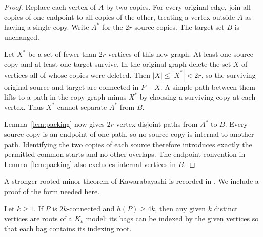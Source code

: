 \begin{proof}
Replace each vertex of $A$ by two copies.  For every original edge, join
all copies of one endpoint to all copies of the other, treating a vertex
outside $A$ as having a single copy.  Write $A^*$ for the $2r$ source
copies.  The target set $B$ is unchanged.

Let $X^*$ be a set of fewer than $2r$ vertices of this new graph.
At least one source copy and at least one target survive.  In the
original graph delete the set $X$ of vertices all of whose copies were
deleted.  Then $|X|\le |X^*|<2r$, so the surviving original source and
target are connected in $P-X$.  A simple path between them lifts to a
path in the copy graph minus $X^*$ by choosing a surviving copy at each
vertex.  Thus $X^*$ cannot separate $A^*$ from $B$.

Lemma~\ref{lem:packing} now gives $2r$ vertex-disjoint paths from $A^*$
to $B$.  Every source copy is an endpoint of one path, so no source copy
is internal to another path.  Identifying the two copies of each source
therefore introduces exactly the permitted common starts and no other
overlaps.  The endpoint convention in Lemma~\ref{lem:packing} also
excludes internal vertices in $B$.
\end{proof}

A stronger rooted-minor theorem of Kawarabayashi is recorded in
\cite[Lemma~5.14]{DelcourtPostle2021}. We include a proof of the form
needed here.

\begin{lemma}\label{lem:rooting}
Let $k\ge1$.  If $P$ is $2k$-connected and $h(P)\ge4k$, then any given
$k$ distinct vertices are roots of a $K_k$ model: its bags can be indexed
by the given vertices so that each bag contains its indexing root.
\end{lemma}

